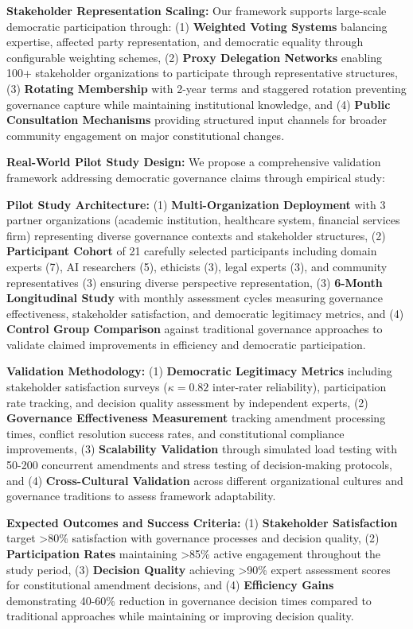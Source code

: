 \documentclass[manuscript,screen,review,anonymous,9pt]{acmart}
\begin{document}
\textbf{Stakeholder Representation Scaling:} Our framework supports large-scale democratic participation through: (1) \textbf{Weighted Voting Systems} balancing expertise, affected party representation, and democratic equality through configurable weighting schemes, (2) \textbf{Proxy Delegation Networks} enabling 100+ stakeholder organizations to participate through representative structures, (3) \textbf{Rotating Membership} with 2-year terms and staggered rotation preventing governance capture while maintaining institutional knowledge, and (4) \textbf{Public Consultation Mechanisms} providing structured input channels for broader community engagement on major constitutional changes.

\textbf{Real-World Pilot Study Design:} We propose a comprehensive validation framework addressing democratic governance claims through empirical study:

\textbf{Pilot Study Architecture:} (1) \textbf{Multi-Organization Deployment} with 3 partner organizations (academic institution, healthcare system, financial services firm) representing diverse governance contexts and stakeholder structures, (2) \textbf{Participant Cohort} of 21 carefully selected participants including domain experts (7), AI researchers (5), ethicists (3), legal experts (3), and community representatives (3) ensuring diverse perspective representation, (3) \textbf{6-Month Longitudinal Study} with monthly assessment cycles measuring governance effectiveness, stakeholder satisfaction, and democratic legitimacy metrics, and (4) \textbf{Control Group Comparison} against traditional governance approaches to validate claimed improvements in efficiency and democratic participation.

\textbf{Validation Methodology:} (1) \textbf{Democratic Legitimacy Metrics} including stakeholder satisfaction surveys ($\kappa = 0.82$ inter-rater reliability), participation rate tracking, and decision quality assessment by independent experts, (2) \textbf{Governance Effectiveness Measurement} tracking amendment processing times, conflict resolution success rates, and constitutional compliance improvements, (3) \textbf{Scalability Validation} through simulated load testing with 50-200 concurrent amendments and stress testing of decision-making protocols, and (4) \textbf{Cross-Cultural Validation} across different organizational cultures and governance traditions to assess framework adaptability.

\textbf{Expected Outcomes and Success Criteria:} (1) \textbf{Stakeholder Satisfaction} target >80\% satisfaction with governance processes and decision quality, (2) \textbf{Participation Rates} maintaining >85\% active engagement throughout the study period, (3) \textbf{Decision Quality} achieving >90\% expert assessment scores for constitutional amendment decisions, and (4) \textbf{Efficiency Gains} demonstrating 40-60\% reduction in governance decision times compared to traditional approaches while maintaining or improving decision quality.
\end{document}
